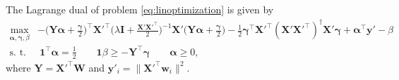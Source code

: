 \documentclass[twoside,11pt]{article}
\newcommand{\mat}[1]{{\mathbf #1}}
\newcommand{\1}{\mat{1}}
\newcommand{\w}{\mat{w}}
\newcommand{\y}{\mat{y}}
\newcommand{\I}{\mat{I}}
\newcommand{\X}{\mat{X}}
\begin{document}
\begin{lemma}
The Lagrange dual of problem \eqref{eq:linoptimization} is given by
\begin{align*}
\max_{\bm \alpha, \bm \gamma, \beta}& -\Big(\mat Y \bm \alpha \!+\! \frac{\bm \gamma}{2}\Big)^\top
\X'^\top \Big(\lambda \I \!+\! \frac{\X' \X'^\top}{2}\Big)^{-1}\X' \Big(\bm
Y \bm\alpha \!+\! \frac{\bm \gamma}{2}\Big)
- \frac{1}{2}\bm \gamma^\top \X'^\top (\X' \X'^\top)^\dag
\X' \bm \gamma + \bm \alpha^\top \y' - \beta\\
\text{s. t.} & \ \1^\top \bm \alpha = \frac{1}{2} \quad \quad  \1
\beta \geq- \mat Y^\top \bm \gamma \quad \quad \bm \alpha\geq
0,
\end{align*}
where $\mat Y = \X'^\top \bm W$ and $\y'_i =\|\X'^\top \w_i\|^2$.
\end{lemma}
\end{document}
